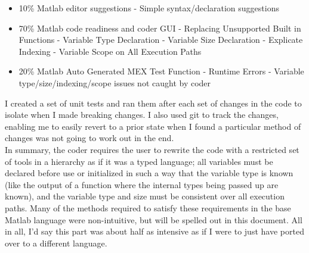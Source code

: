 \documentclass{article}
\begin{document}
\begin{itemize}

  \item 10\% Matlab editor suggestions
	  \subitem - Simple syntax/declaration suggestions
  \item 70\% Matlab code readiness and coder GUI
	  \subitem - Replacing Unsupported Built in Functions
	  \subitem - Variable Type Declaration
	  \subitem - Variable Size Declaration
	  \subitem - Explicate Indexing
	  \subitem - Variable Scope on All Execution Paths
  \item 20\% Matlab Auto Generated MEX Test Function - Runtime Errors
	  \subitem - Variable type/size/indexing/scope issues not caught by coder

\end{itemize}

I created a set of unit tests and ran them after each set of changes in the code to isolate when I made breaking changes. I also used git to track the changes, enabling me to easily revert to a prior state when I found a particular method of changes was not going to work out in the end. \\

In summary, the coder requires the user to rewrite the code with a restricted set of tools in a hierarchy as if it was a typed language; all variables must be declared before use or initialized in such a way that the variable type is known (like the output of a function where the internal types being passed up are known), and the variable type and size must be consistent over all execution paths.  Many of the methods required to satisfy these requirements in the base Matlab language were non-intuitive, but will be spelled out in this document.  All in all, I'd say this part was about half as intensive as if I were to just have ported over to a different language.
\end{document}
